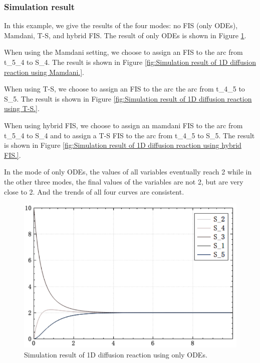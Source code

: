 \documentclass[journal,a4paper,onecolumn]{article}
\begin{document}
\clearpage
\subsubsection{Simulation result}
In this example, we give the results of the four modes: no FIS (only ODEs), Mamdani, T-S, and hybrid FIS. The result of only ODEs is shown in Figure \ref{fig:Simulation result of 1D diffusion reaction using only ODEs.}.

When using the Mamdani setting, we choose to assign an FIS to the arc from t\_5\_4 to S\_4. The result is shown in Figure \ref{fig:Simulation result of 1D diffusion reaction using Mamdani.}.

When using T-S, we choose to assign an FIS to the arc the arc from t\_4\_5 to S\_5. The result is shown in Figure \ref{fig:Simulation result of 1D diffusion reaction using T-S.}.

When using hybrid FIS, we choose to assign an mamdani FIS to the arc from t\_5\_4 to S\_4 and to assign a T-S FIS to the arc from t\_4\_5 to S\_5. 
The result is shown in Figure \ref{fig:Simulation result of 1D diffusion reaction using hybrid FIS.}.

In the mode of only ODEs, the values of all variables eventually reach 2 while in the other three modes, the final values of the variables are not 2, but are very close to 2. And the trends of all four curves are consistent.

\begin{figure}[!hbt]
	\begin{center}
		\includegraphics[width=\columnwidth]{fig21}
		\caption{Simulation result of 1D diffusion reaction using only ODEs.}
		\label{fig:Simulation result of 1D diffusion reaction using only ODEs.}
	\end{center}
\end{figure}
\end{document}
